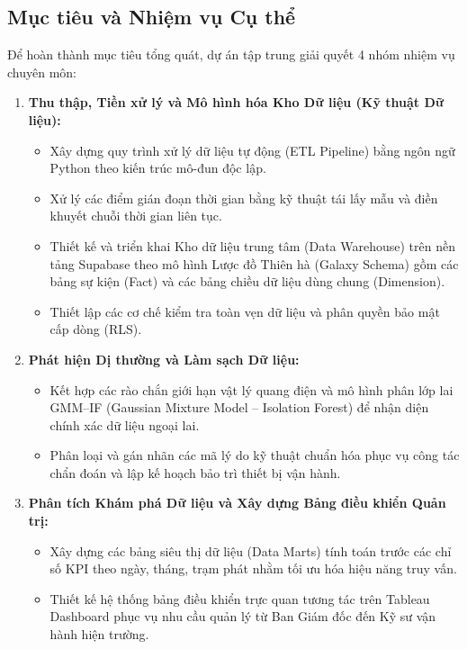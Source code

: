 \documentclass[12pt, a4paper]{report}
\begin{document}
\subsection{Mục tiêu và Nhiệm vụ Cụ thể}
Để hoàn thành mục tiêu tổng quát, dự án tập trung giải quyết 4 nhóm nhiệm vụ chuyên môn:
\begin{enumerate}[label=\arabic*., leftmargin=*]
    \item \textbf{Thu thập, Tiền xử lý và Mô hình hóa Kho Dữ liệu (Kỹ thuật Dữ liệu):}
    \begin{itemize}[noitemsep]
        \item Xây dựng quy trình xử lý dữ liệu tự động (ETL Pipeline) bằng ngôn ngữ Python theo kiến trúc mô-đun độc lập.
        \item Xử lý các điểm gián đoạn thời gian bằng kỹ thuật tái lấy mẫu và điền khuyết chuỗi thời gian liên tục.
        \item Thiết kế và triển khai Kho dữ liệu trung tâm (Data Warehouse) trên nền tảng Supabase theo mô hình Lược đồ Thiên hà (Galaxy Schema) gồm các bảng sự kiện (Fact) và các bảng chiều dữ liệu dùng chung (Dimension).
        \item Thiết lập các cơ chế kiểm tra toàn vẹn dữ liệu và phân quyền bảo mật cấp dòng (RLS).
    \end{itemize}
    \item \textbf{Phát hiện Dị thường và Làm sạch Dữ liệu:}
    \begin{itemize}[noitemsep]
        \item Kết hợp các rào chắn giới hạn vật lý quang điện và mô hình phân lớp lai GMM--IF (Gaussian Mixture Model -- Isolation Forest) để nhận diện chính xác dữ liệu ngoại lai.
        \item Phân loại và gán nhãn các mã lý do kỹ thuật chuẩn hóa phục vụ công tác chẩn đoán và lập kế hoạch bảo trì thiết bị vận hành.
    \end{itemize}
    \item \textbf{Phân tích Khám phá Dữ liệu và Xây dựng Bảng điều khiển Quản trị:}
    \begin{itemize}[noitemsep]
        \item Xây dựng các bảng siêu thị dữ liệu (Data Marts) tính toán trước các chỉ số KPI theo ngày, tháng, trạm phát nhằm tối ưu hóa hiệu năng truy vấn.
        \item Thiết kế hệ thống bảng điều khiển trực quan tương tác trên Tableau Dashboard phục vụ nhu cầu quản lý từ Ban Giám đốc đến Kỹ sư vận hành hiện trường.
    \end{itemize}

\end{enumerate}
\end{document}

